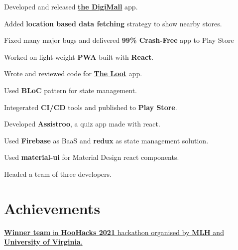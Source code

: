 \documentclass[]{deedy-resume-openfont}
\begin{document}
\begin{minipage}[t]{0.67\textwidth}
\begin{tightemize}
\item Developed and released \href{https://play.google.com/store/apps/details?id=com.business.prachar}{\textbf{the DigiMall}} app.
\item Added \textbf{location based data fetching} strategy to show nearby stores. 
\item Fixed many major bugs and delivered \textbf{99\% Crash-Free} app to Play Store
\item Worked on light-weight \textbf{PWA} built with \textbf{React}.
\end{tightemize}
\sectionsep

\begin{tightemize}
\item Wrote and reviewed code for \href{https://play.google.com/store/apps/details?id=com.arette.students}{\textbf{The Loot}} app.
\item Used \textbf{BLoC} pattern for state management. 
\item Integerated \textbf{CI/CD} tools and published to \textbf{Play Store}.
\end{tightemize}
\sectionsep

\begin{tightemize}
\item Developed \textbf{Assistroo}, a quiz app made with react.
\item Used \textbf{Firebase} as BaaS and \textbf{redux} as state management solution. 
\item Used \textbf{material-ui} for Material Design react components.
\item Headed a team of three developers.
\end{tightemize}
\sectionsep
\section{Achievements} 
\href{https://devpost.com/software/finlearn}{{\textbf{Winner team}} in \textbf{HooHacks 2021} hackathon organised by \textbf{MLH} and \textbf{University of Virginia}.}

\end{minipage} 
\end{document}
